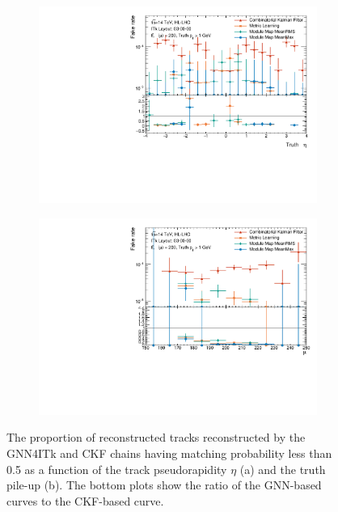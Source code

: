 \begin{figure}[h!]
\centering
\begin{subfigure}[b]{0.75\textwidth}
    \centering
    \includegraphics[width=\textwidth]{figures/ckf-gnn/FakeRate/fakerate_vs_eta.pdf}
    \caption{}
    \label{subfig:tracking-fake-eta}
\end{subfigure}
\begin{subfigure}[b]{0.75\textwidth}
    \centering
    \includegraphics[width=\textwidth]{figures/ckf-gnn/FakeRate/fakerate_vs_mu.pdf}
    \caption{}
    \label{subfig:tracking-fake-mu}
\end{subfigure}
    \caption{The proportion of reconstructed tracks reconstructed by the GNN4ITk and CKF chains having matching probability less than 0.5 as a function of the track pseudorapidity $\eta$ (a) and the truth pile-up (b). The bottom plots show the ratio of the GNN-based curves to the CKF-based curve.}
    \label{fig:tracking-fake-eta-mu}
\end{figure}

